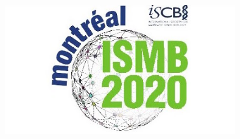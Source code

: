 \documentclass[a0,portrait]{a0poster}
\begin{document}
\begin{minipage}[b]{0.2\linewidth}
\hfill\includegraphics[width=10cm]{Poster_Li/figures/ismb2020.jpg}
\end{minipage}

\vspace{1cm} %

\end{document}
